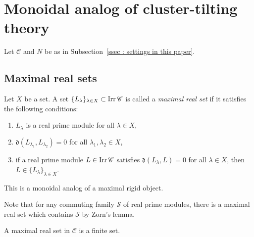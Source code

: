 \section{Monoidal analog of cluster-tilting theory}
\label{Sec : monoidal analog of cluster tilting theory}

Let $\mathscr{C}$ and $N$ be as in
Subsection~\ref{ssec : settings in this paper}.

\subsection{Maximal real sets}
\label{ssec : maximal real set}

\begin{Def}
\label{Def : maximal real set}
Let $X$ be a set.
A set $\{L_\lambda\}_{\lambda \in X} \subset \mathop{\mathrm{Irr}}\nolimits\mathscr{C}$
is called a \emph{maximal real set}
if it satisfies the following conditions:
\begin{enumerate}
    \item[(i)] $L_\lambda$ is a real prime module
    for all $\lambda \in X$,
    \item[(ii)] $\mathfrak{d}(L_{\lambda_1}, L_{\lambda_2}) = 0$
    for all $\lambda_1, \lambda_2 \in X$,
    \item[(iii)] if a real prime module $L \in \mathop{\mathrm{Irr}}\nolimits\mathscr{C}$
    satisfies $\mathfrak{d}(L_\lambda, L) = 0$
    for all $\lambda \in X$,
    then $L \in \{L_\lambda\}_{\lambda \in X}$.
\end{enumerate}
\end{Def}

This is a monoidal analog of a maximal rigid object. 

Note that for any commuting family $\mathcal{S}$ of real prime modules,
there is a maximal real set which contains $\mathcal{S}$
by Zorn's lemma.

\begin{Lem}
\label{Lem : finiteness of maximal real sets}
A maximal real set in $\mathscr{C}$ is a finite set.
\end{Lem}

